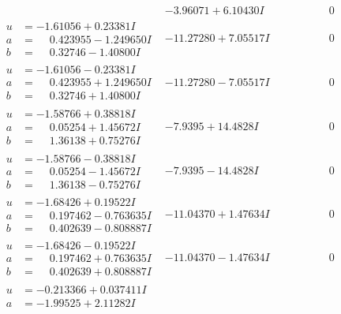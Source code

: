 \documentclass[1p]{elsarticle_modified}
\theoremstyle{definition}
\begin{document}
$$\begin{array}{c|c|c}
 & -3.96071 + 6.10430 I & \phantom{-0.000000 } 0 \\ \hline\begin{aligned}
u &= -1.61056 + 0.23381 I \\
a &= \phantom{-}0.423955 - 1.249650 I \\
b &= \phantom{-}0.32746 - 1.40800 I\end{aligned}
 & -11.27280 + 7.05517 I & \phantom{-0.000000 } 0 \\ \hline\begin{aligned}
u &= -1.61056 - 0.23381 I \\
a &= \phantom{-}0.423955 + 1.249650 I \\
b &= \phantom{-}0.32746 + 1.40800 I\end{aligned}
 & -11.27280 - 7.05517 I & \phantom{-0.000000 } 0 \\ \hline\begin{aligned}
u &= -1.58766 + 0.38818 I \\
a &= \phantom{-}0.05254 + 1.45672 I \\
b &= \phantom{-}1.36138 + 0.75276 I\end{aligned}
 & -7.9395 + 14.4828 I & \phantom{-0.000000 } 0 \\ \hline\begin{aligned}
u &= -1.58766 - 0.38818 I \\
a &= \phantom{-}0.05254 - 1.45672 I \\
b &= \phantom{-}1.36138 - 0.75276 I\end{aligned}
 & -7.9395 - 14.4828 I & \phantom{-0.000000 } 0 \\ \hline\begin{aligned}
u &= -1.68426 + 0.19522 I \\
a &= \phantom{-}0.197462 - 0.763635 I \\
b &= \phantom{-}0.402639 - 0.808887 I\end{aligned}
 & -11.04370 + 1.47634 I & \phantom{-0.000000 } 0 \\ \hline\begin{aligned}
u &= -1.68426 - 0.19522 I \\
a &= \phantom{-}0.197462 + 0.763635 I \\
b &= \phantom{-}0.402639 + 0.808887 I\end{aligned}
 & -11.04370 - 1.47634 I & \phantom{-0.000000 } 0 \\ \hline\begin{aligned}
u &= -0.213366 + 0.037411 I \\
a &= -1.99525 + 2.11282 I \\

\end{aligned}
\end{array}$$
\end{document}
